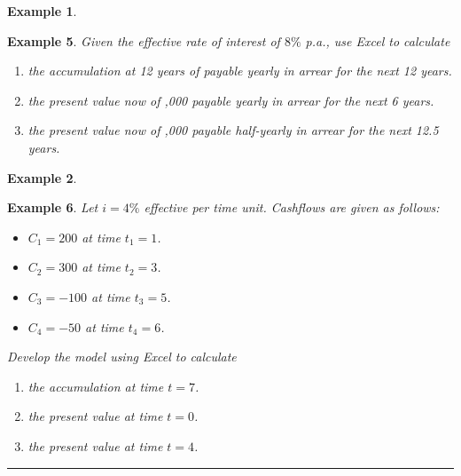\documentclass[
]{article}
\theoremstyle{definition}
\theoremstyle{definition}
\newtheorem{example}{Example}[section]
\theoremstyle{definition}
\theoremstyle{definition}
\theoremstyle{remark}
\begin{document}
\begin{example}
\protect\hypertarget{exm:unlabeled-div-7}{}\label{exm:unlabeled-div-7}

\textbf{Example 5}. \emph{Given the effective rate of interest of \(8\%\) p.a., use
Excel to calculate}

\begin{enumerate}
\def\labelenumi{\arabic{enumi}.}
\item
  \emph{the accumulation at 12 years of payable yearly in arrear for the
  next 12 years.}
\item
  \emph{the present value now of ,000 payable yearly in arrear for the next
  6 years.}
\item
  \emph{the present value now of ,000 payable half-yearly in arrear for the
  next 12.5 years.}
\end{enumerate}

\end{example}

\begin{example}
\protect\hypertarget{exm:unlabeled-div-8}{}\label{exm:unlabeled-div-8}

\textbf{Example 6}. \emph{Let \(i = 4\%\) effective per time unit. Cashflows are
given as follows:}

\begin{itemize}
\item
  \emph{\(C_1 = 200\) at time \(t_1 = 1\).}
\item
  \emph{\(C_2 = 300\) at time \(t_2 = 3\).}
\item
  \emph{\(C_3 = -100\) at time \(t_3 = 5\).}
\item
  \emph{\(C_4 = -50\) at time \(t_4 = 6\).}
\end{itemize}

\emph{Develop the model using Excel to calculate}

\begin{enumerate}
\def\labelenumi{\arabic{enumi}.}
\item
  \emph{the accumulation at time \(t = 7\).}
\item
  \emph{the present value at time \(t = 0\).}
\item
  \emph{the present value at time \(t = 4\).}
\end{enumerate}

\end{example}

\begin{center}\rule{0.5\linewidth}{0.5pt}\end{center}
\end{document}
